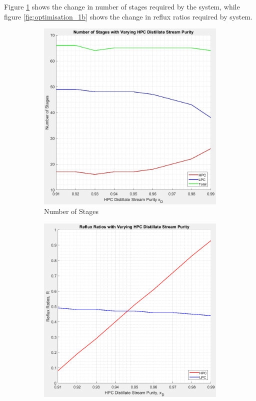 \documentclass[11pt,oneside]{article}
\begin{document}
    \noindent Figure \ref{fig:optimisation_1a} shows the change in number of stages required by the system, while figure \ref{fig:optimisation_1b} shows the change in reflux ratios required by system. \\
    \begin{figure}[ht]
        \centering
        \begin{subfigure}{0.49\textwidth}
            \includegraphics[width=\linewidth]{graph-stages_vs_HPCxD.jpg}
            \caption{Number of Stages} \label{fig:optimisation_1a}
        \end{subfigure}
        \hspace*{\fill} %
        \begin{subfigure}{0.49\textwidth}
            \includegraphics[width=\linewidth]{graph-reflux_vs_HPCxD.jpeg}

\end{subfigure}
\end{figure}
\end{document}
